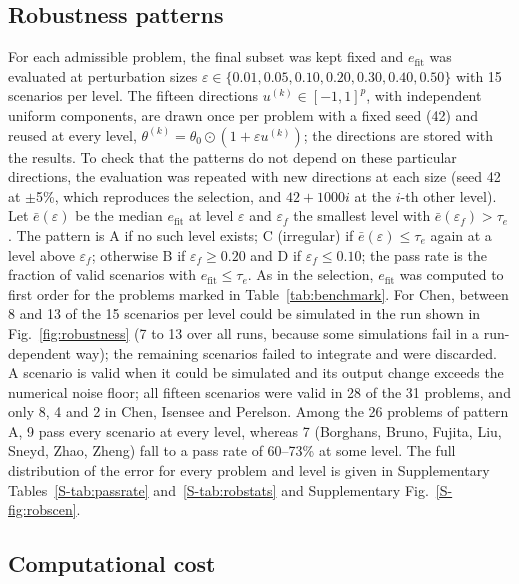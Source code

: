 \documentclass[pdflatex,sn-nature]{sn-jnl}
\theoremstyle{plain}
\begin{document}
\subsection*{Robustness patterns}\label{met:robust}

For each admissible problem, the final subset was kept fixed and $e_{\mathrm{fit}}$ was evaluated at perturbation sizes $\varepsilon\in\{0.01,0.05,0.10,0.20,0.30,0.40,0.50\}$ with 15 scenarios per level. The fifteen directions $u^{(k)}\in[-1,1]^p$, with independent uniform components, are drawn once per problem with a fixed seed (42) and reused at every level, $\theta^{(k)}=\theta_0\odot(1+\varepsilon u^{(k)})$; the directions are stored with the results. To check that the patterns do not depend on these particular directions, the evaluation was repeated with new directions at each size (seed 42 at $\pm$5\%, which reproduces the selection, and $42+1000i$ at the $i$-th other level). Let $\bar e(\varepsilon)$ be the median $e_{\mathrm{fit}}$ at level $\varepsilon$ and $\varepsilon_f$ the smallest level with $\bar e(\varepsilon_f)>\tau_e$. The pattern is A if no such level exists; C (irregular) if $\bar e(\varepsilon)\le\tau_e$ again at a level above $\varepsilon_f$; otherwise B if $\varepsilon_f\ge0.20$ and D if $\varepsilon_f\le0.10$; the pass rate is the fraction of valid scenarios with $e_{\mathrm{fit}}\le\tau_e$. As in the selection, $e_{\mathrm{fit}}$ was computed to first order for the problems marked in Table~\ref{tab:benchmark}. For Chen, between 8 and 13 of the 15 scenarios per level could be simulated in the run shown in Fig.~\ref{fig:robustness} (7 to 13 over all runs, because some simulations fail in a run-dependent way); the remaining scenarios failed to integrate and were discarded. A scenario is valid when it could be simulated and its output change exceeds the numerical noise floor; all fifteen scenarios were valid in 28 of the 31 problems, and only 8, 4 and 2 in Chen, Isensee and Perelson. Among the 26 problems of pattern A, 9 pass every scenario at every level, whereas 7 (Borghans, Bruno, Fujita, Liu, Sneyd, Zhao, Zheng) fall to a pass rate of 60--73\% at some level. The full distribution of the error for every problem and level is given in Supplementary Tables~\ref{S-tab:passrate} and~\ref{S-tab:robstats} and Supplementary Fig.~\ref{S-fig:robscen}.

\subsection*{Computational cost}\label{met:cost}
\end{document}
